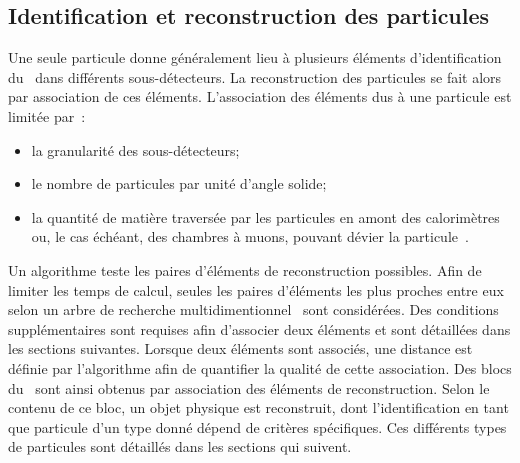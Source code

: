 \subsection{Identification et reconstruction des particules}\label{chapter-LHC-section-evt_reco-subsec-ptc_ID}
Une seule particule donne généralement lieu à plusieurs éléments d'identification du \PF\ dans différents sous-détecteurs.
La reconstruction des particules se fait alors par association de ces éléments.
L'association des éléments dus à une particule est limitée par~\cite{particle-flow}:
\begin{itemize}
\item la granularité des sous-détecteurs;
\item le nombre de particules par unité d'angle solide;
\item la quantité de matière traversée par les particules en amont des calorimètres ou, le cas échéant, des chambres à muons, pouvant dévier la particule~\cite{moliere_scat_1,moliere_scat_2}.
\end{itemize}
\par Un algorithme teste les paires d'éléments de reconstruction possibles.
Afin de limiter les temps de calcul, seules les paires d'éléments les plus proches entre eux selon un arbre de recherche multidimentionnel~\cite{bentley} sont considérées.
Des conditions supplémentaires sont requises afin d'associer deux éléments et sont détaillées dans les sections suivantes.
Lorsque deux éléments sont associés, une distance est définie par l'algorithme afin de quantifier la qualité de cette association.
Des \og blocs \fg{} du \PF\ sont ainsi obtenus par association des éléments de reconstruction.
Selon le contenu de ce bloc, un objet physique est reconstruit, dont l'identification en tant que particule d'un type donné dépend de critères spécifiques.
Ces différents types de particules sont détaillés dans les sections qui suivent.
